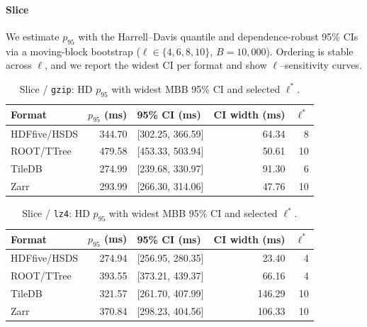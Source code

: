 \documentclass[nomenclature, english, bibtex]{kththesis}
\numberwithin{listing}{chapter}
\begin{document}
\paragraph{Slice}
We estimate $p_{95}$ with the Harrell–Davis quantile and dependence-robust 95\% \glspl{CI} via a moving-block bootstrap (\(\ell\in\{4,6,8,10\}\), \(B{=}10{,}000\)). Ordering is stable across \(\ell\), and we report the widest \gls{CI} per format and show \(\ell\)–sensitivity curves.

\begin{table}[H]
  \centering
  \caption{Slice / \texttt{gzip}: \gls{HD} $p_{95}$ with widest \gls{MBB} 95\% \gls{CI} and selected $\ell^{\ast}$.}
  \label{tab:tail-slice-gzip-p95-selected}
  \begin{tabular}{l r l r r}
    \toprule
    Format & $p_{95}$ (ms) & 95\% \gls{CI} (ms) & \gls{CI} width (ms) & $\ell^{\ast}$ \\
    \midrule
    \gls{HDFfive}/\gls{HSDS}   & 344.70 & [302.25, 366.59] & 64.34 & 8  \\
    \gls{ROOT}/\gls{TTree}   & 479.58 & [453.33, 503.94] & 50.61 & 10 \\
    TileDB & 274.99 & [239.68, 330.97] & 91.30 & 6  \\
    Zarr   & 293.99 & [266.30, 314.06] & 47.76 & 10 \\
    \bottomrule
  \end{tabular}
\end{table}

\begin{table}[H]
  \centering
  \caption{Slice / \texttt{lz4}: \gls{HD} $p_{95}$ with widest \gls{MBB} 95\% \gls{CI} and selected $\ell^{\ast}$.}
  \label{tab:tail-slice-lz4-p95-selected}
  \begin{tabular}{l r l r r}
    \toprule
    Format & $p_{95}$ (ms) & 95\% \gls{CI} (ms) & \gls{CI} width (ms) & $\ell^{\ast}$ \\
    \midrule
    \gls{HDFfive}/\gls{HSDS}   & 274.94 & [256.95, 280.35] & 23.40 & 4  \\
    \gls{ROOT}/\gls{TTree}   & 393.55 & [373.21, 439.37] & 66.16 & 4  \\
    TileDB & 321.57 & [261.70, 407.99] & 146.29 & 10 \\
    Zarr   & 370.84 & [298.23, 404.56] & 106.33 & 10 \\
    \bottomrule
  \end{tabular}
\end{table}
\end{document}
